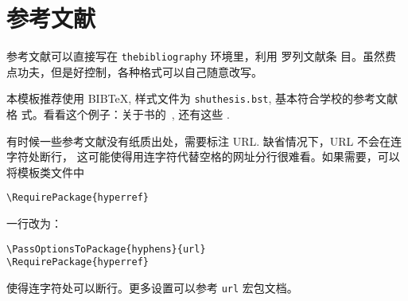 \chapter{参考文献}
\label{cha:bib}
参考文献可以直接写在 \texttt{thebibliography} 环境里，利用  罗列文献条
目。虽然费点功夫，但是好控制，各种格式可以自己随意改写。

本模板推荐使用 BIB\TeX, 样式文件为 \texttt{shuthesis.bst}, 基本符合学校的参考文献格
式。看看这个例子：关于书的~\cite{tex1989,algebra2000}, 还有这些 \cite{nikiforov2014,
BuFanZhou2016:Z-eigenvalues,HuQiShao2013:Cored-Hypergraphs,KangNikiforov2014:Extremal-Problems,
LinZhou2016:Distance-Spectral,LuMan2016:Small-Spectral-Radius,Nikiforov2017:Symmetric-Spectrum,
Qi2014:H-Plus-Eigenvalues}.

有时候一些参考文献没有纸质出处，需要标注 URL. 缺省情况下，URL 不会在连字符处断行，
这可能使得用连字符代替空格的网址分行很难看。如果需要，可以将模板类文件中
\begin{verbatim}
\RequirePackage{hyperref}
\end{verbatim}
一行改为：
\begin{verbatim}
\PassOptionsToPackage{hyphens}{url}
\RequirePackage{hyperref}
\end{verbatim}
使得连字符处可以断行。更多设置可以参考 \texttt{url} 宏包文档。